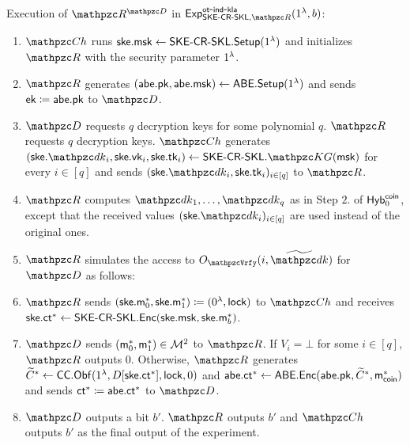 \begin{description}
\item Execution of $\qR^{\qD}$ in
$\expc{\SKECRSKL,\qR}{ot}{ind}{kla}(1^\secp, b)$:

\begin{enumerate}
\item $\qCh$ runs $\mathsf{ske}.\mathsf{msk} \leftarrow \mathsf{SKE}\textrm{-}\mathsf{CR}\textrm{-}\mathsf{SKL}.\mathsf{Setup}(1^\lambda)$ and initializes $\qR$
with the security parameter $1^\lambda$.
\item $\qR$ generates $(\mathsf{abe}.\mathsf{pk}, \mathsf{abe}.\mathsf{msk}) \leftarrow
\mathsf{ABE}.\mathsf{Setup}(1^\lambda)$ and sends $\mathsf{ek} \coloneqq \mathsf{abe}.\mathsf{pk}$ to $\qD$.
\item $\qD$ requests $q$ decryption keys for some polynomial $q$.
$\qR$ requests $q$ decryption keys. $\qCh$ generates $(\ske.\qdk_i,
\ske.\vk_i, \ske.\tk_i) \gets \SKECRSKL.\qKG(\msk)$ for every $i \in [q]$
and sends $(\ske.\qdk_i, \ske.\tk_i)_{i\in[q]}$ to $\qR$.
\item $\qR$ computes $\qdk_1, \ldots, \qdk_q$ as in Step $2.$ of
$\mathsf{Hyb}_0^{\mathsf{coin}}$, except that the received values
$(\ske.\qdk_i)_{i \in [q]}$ are used instead of the original ones.
\item $\qR$ simulates the access to $\Oracle{\qVrfy}(i,
\widetilde{\qdk})$ for $\qD$ as follows:
\item $\qR$ sends $(\mathsf{ske}.\mathsf{m}_0^*, \mathsf{ske}.\mathsf{m}_1^*) \coloneqq (0^\lambda, \mathsf{lock})$
to $\qCh$ and receives $\mathsf{ske}.\mathsf{ct}^* \leftarrow \mathsf{SKE}\textrm{-}\mathsf{CR}\textrm{-}\mathsf{SKL}.\mathsf{Enc}(\mathsf{ske}.\mathsf{msk},
\mathsf{ske}.\mathsf{m}^*_b)$.
\item $\qD$ sends $(\mathsf{m}_0^*, \mathsf{m}_1^*) \in \mathcal{M}^2$ to $\qR$. If $V_i =
\bot$ for some $i\in[q]$, $\qR$ outputs $0$. Otherwise, $\qR$
generates $\widetilde{C}^* \leftarrow \mathsf{CC}.\mathsf{Obf}(1^\lambda, D[\mathsf{ske}.\mathsf{ct}^*], \mathsf{lock}, 0)$
and $\mathsf{abe}.\mathsf{ct}^* \leftarrow \mathsf{ABE}.\mathsf{Enc}(\mathsf{abe}.\mathsf{pk}, \widetilde{C}^*, \mathsf{m}^*_{\mathsf{coin}})$ and
sends $\mathsf{ct}^* \coloneqq \mathsf{abe}.\mathsf{ct}^*$ to $\qD$.
\item $\qD$ outputs a bit $b'$. $\qR$ outputs $b'$ and $\qCh$
outputs $b'$ as the final output of the experiment.
\end{enumerate}
\end{description}

